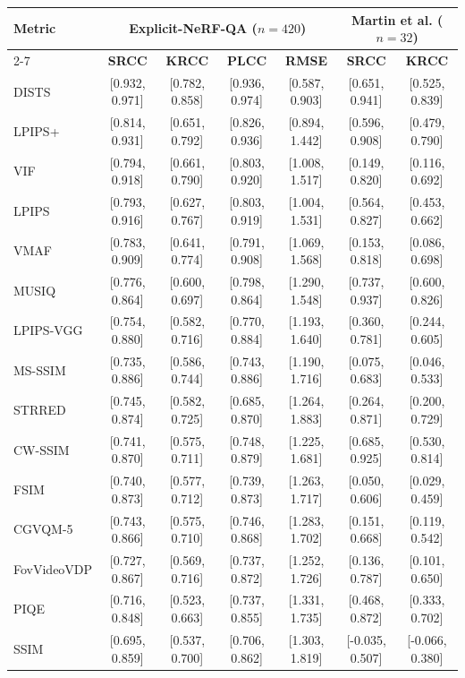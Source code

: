 \begin{tabular}{l|cccc|cc}
\hline
\multirow{2}{*}{\textbf{Metric}} & \multicolumn{4}{c|}{\textbf{Explicit-NeRF-QA ($n = 420$)}} & \multicolumn{2}{c}{\textbf{Martin et al. ($n = 32$)}} \\
\cline{2-7}
 & \textbf{SRCC} & \textbf{KRCC} & \textbf{PLCC} & \textbf{RMSE} & \textbf{SRCC} & \textbf{KRCC} \\
\hline
DISTS & [0.932, 0.971] & [0.782, 0.858] & [0.936, 0.974] & [0.587, 0.903] & [0.651, 0.941] & [0.525, 0.839] \\
LPIPS+ & [0.814, 0.931] & [0.651, 0.792] & [0.826, 0.936] & [0.894, 1.442] & [0.596, 0.908] & [0.479, 0.790] \\
VIF & [0.794, 0.918] & [0.661, 0.790] & [0.803, 0.920] & [1.008, 1.517] & [0.149, 0.820] & [0.116, 0.692] \\
LPIPS & [0.793, 0.916] & [0.627, 0.767] & [0.803, 0.919] & [1.004, 1.531] & [0.564, 0.827] & [0.453, 0.662] \\
VMAF & [0.783, 0.909] & [0.641, 0.774] & [0.791, 0.908] & [1.069, 1.568] & [0.153, 0.818] & [0.086, 0.698] \\
MUSIQ & [0.776, 0.864] & [0.600, 0.697] & [0.798, 0.864] & [1.290, 1.548] & [0.737, 0.937] & [0.600, 0.826] \\
LPIPS-VGG & [0.754, 0.880] & [0.582, 0.716] & [0.770, 0.884] & [1.193, 1.640] & [0.360, 0.781] & [0.244, 0.605] \\
MS-SSIM & [0.735, 0.886] & [0.586, 0.744] & [0.743, 0.886] & [1.190, 1.716] & [0.075, 0.683] & [0.046, 0.533] \\
STRRED & [0.745, 0.874] & [0.582, 0.725] & [0.685, 0.870] & [1.264, 1.883] & [0.264, 0.871] & [0.200, 0.729] \\
CW-SSIM & [0.741, 0.870] & [0.575, 0.711] & [0.748, 0.879] & [1.225, 1.681] & [0.685, 0.925] & [0.530, 0.814] \\
FSIM & [0.740, 0.873] & [0.577, 0.712] & [0.739, 0.873] & [1.263, 1.717] & [0.050, 0.606] & [0.029, 0.459] \\
CGVQM-5 & [0.743, 0.866] & [0.575, 0.710] & [0.746, 0.868] & [1.283, 1.702] & [0.151, 0.668] & [0.119, 0.542] \\
FovVideoVDP & [0.727, 0.867] & [0.569, 0.716] & [0.737, 0.872] & [1.252, 1.726] & [0.136, 0.787] & [0.101, 0.650] \\
PIQE & [0.716, 0.848] & [0.523, 0.663] & [0.737, 0.855] & [1.331, 1.735] & [0.468, 0.872] & [0.333, 0.702] \\
SSIM & [0.695, 0.859] & [0.537, 0.700] & [0.706, 0.862] & [1.303, 1.819] & [-0.035, 0.507] & [-0.066, 0.380] \\

\end{tabular}
